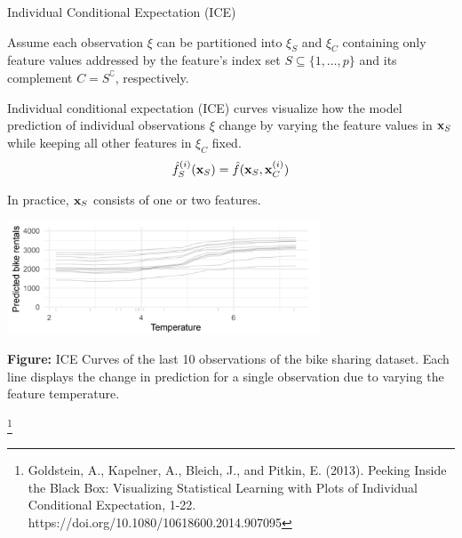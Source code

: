\documentclass[11pt,compress,t,notes=noshow, xcolor=table]{beamer}
\begin{document}
\begin{vbframe}{Individual Conditional Expectation (ICE)}

Assume each observation $\xi$ can be partitioned into $\xi_S$ and $\xi_C$ containing only feature values addressed by the feature's index set $S \subseteq \{1, \dots, p\}$ and its complement $C = S^\complement$, respectively.

\lz

Individual conditional expectation (ICE) curves visualize how the model prediction of individual observations $\xi$
change by varying the feature values in $\xv_S$ while keeping all other features in $\xi_C$ fixed.
$$\fh_{S}^{(i)}(\xv_S) = \fh(\xv_S, \xi_C)$$

\framebreak

In practice, $\xv_S$ consists of one or two features.

\vspace{-0.2cm}
\begin{center}
\includegraphics[width=0.7\textwidth]{figure_man/ICE01.png}
\end{center}
\vspace{-0.3cm}
\scriptsize{\textbf{Figure:} ICE Curves of the last 10 observations of the bike sharing dataset. Each line displays the change in prediction for a single observation due to varying the feature temperature.\par}

\footnote[frame]{Goldstein, A., Kapelner, A., Bleich, J., and Pitkin, E. (2013). Peeking Inside the Black Box: Visualizing Statistical Learning with Plots of Individual Conditional Expectation, 1-22. https://doi.org/10.1080/10618600.2014.907095}
\end{vbframe}
\end{document}
